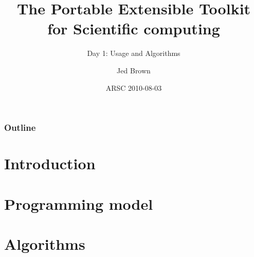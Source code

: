 \documentclass{beamer}
\title[PETSc day 1]{The Portable Extensible Toolkit for Scientific computing}
\subtitle{Day 1: Usage and Algorithms}
\author{Jed Brown}
\institute[ETH Z\"urich]
{

}
\date{ARSC 2010-08-03}
\begin{document}
\lstset{language=C}

\begin{frame}
\titlepage
\end{frame}

\begin{frame}
\frametitle{Outline}
\tableofcontents
\end{frame}


\section{Introduction}





\section{Programming model}





\section{Algorithms}

% 
% 
% 



% 
% 
% 
\end{document}

